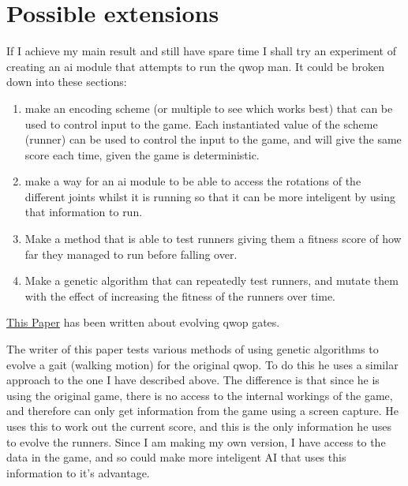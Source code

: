 \documentclass[12pt,a4paper,twoside]{article}
\begin{document}
\section*{Possible extensions}


If I achieve my main result and still have spare time I shall try an experiment of creating an ai module that attempts to run the qwop man. It could be broken down into these sections:

\begin{enumerate}
\item make an encoding scheme (or multiple to see which works best) that can be used to control input to the game. Each instantiated value of the scheme (runner) can be used to control the input to the game, and will give the same score each time, given the game is deterministic.

\item  make a way for an ai module to be able to access the rotations of the different joints whilst it is running so that it can be more inteligent by using that information to run.

\item Make a method that is able to test runners giving them a fitness score of how far they managed to run before falling over.
  
\item Make a genetic algorithm that can repeatedly test runners, and mutate them with the effect of increasing the fitness of the runners over time.
\end{enumerate}

 
\href{https://dl.acm.org/citation.cfm?id=2598248}{This Paper} has been written about evolving qwop gates.

The writer of this paper tests various methods of using genetic algorithms to evolve a gait (walking motion) for the original qwop.
To do this he uses a similar approach to the one I have described above. The difference is that since he is using the original game, there is no access to the internal workings of the game, and therefore can only get information from the game using a screen capture. He uses this to work out the current score, and this is the only information he uses to evolve the runners. Since I am making my own version, I have access to the data in the game, and so could make more inteligent AI that uses this information to it's advantage.
\end{document}
